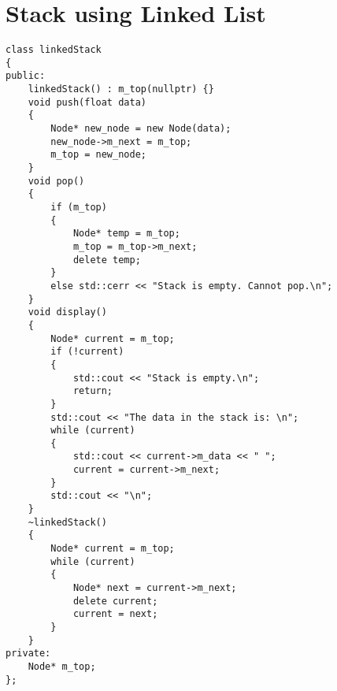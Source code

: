\documentclass[12pt]{article}
\title{}
\date{}
\author{}
\begin{document}
	\vspace{-4cm}

	\section*{Stack using Linked List}
	\begin{verbatim}
class linkedStack
{
public:
    linkedStack() : m_top(nullptr) {}
    void push(float data)
    {
        Node* new_node = new Node(data);
        new_node->m_next = m_top;
        m_top = new_node;
    }
    void pop()
    {
        if (m_top)
        {
            Node* temp = m_top;
            m_top = m_top->m_next;
            delete temp;
        }
        else std::cerr << "Stack is empty. Cannot pop.\n";
    }
    void display()
    {
        Node* current = m_top;
        if (!current)
        {
            std::cout << "Stack is empty.\n";
            return;
        }
        std::cout << "The data in the stack is: \n";
        while (current)
        {
            std::cout << current->m_data << " ";
            current = current->m_next;
        }
        std::cout << "\n";
    }
    ~linkedStack()
    {
        Node* current = m_top;
        while (current)
        {
            Node* next = current->m_next;
            delete current;
            current = next;
        }
    }
private:
    Node* m_top;
};

	\end{verbatim}
\end{document}
